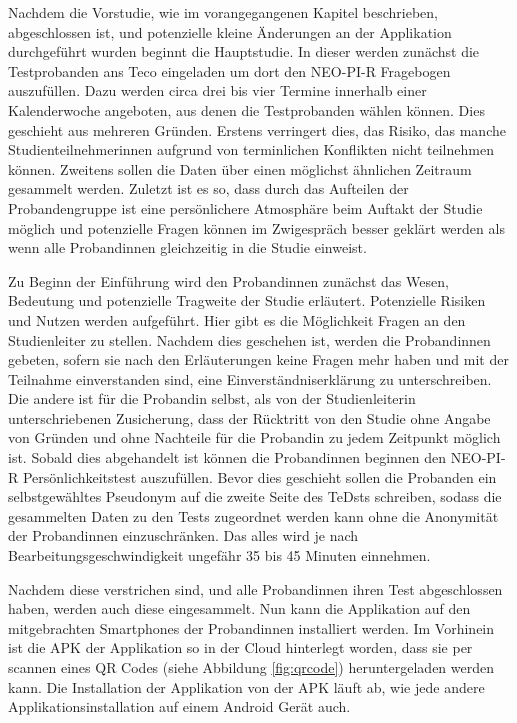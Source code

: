 Nachdem die Vorstudie, wie im vorangegangenen Kapitel beschrieben, abgeschlossen ist, und potenzielle kleine Änderungen an der Applikation durchgeführt wurden beginnt die Hauptstudie.
In dieser werden zunächst die Testprobanden ans Teco eingeladen um dort den NEO-PI-R Fragebogen auszufüllen.
Dazu werden circa drei bis vier Termine innerhalb einer Kalenderwoche angeboten, aus denen die Testprobanden wählen können.
Dies geschieht aus mehreren Gründen. 
Erstens verringert dies, das Risiko, das manche Studienteilnehmerinnen aufgrund von terminlichen Konflikten nicht teilnehmen können.
Zweitens sollen die Daten über einen möglichst ähnlichen Zeitraum gesammelt werden.
Zuletzt ist es so, dass durch das Aufteilen der Probandengruppe ist eine persönlichere Atmosphäre beim Auftakt der Studie möglich
und potenzielle Fragen können im Zwigespräch besser geklärt werden als wenn alle Probandinnen gleichzeitig in die Studie einweist.
\par
Zu Beginn der Einführung wird den Probandinnen zunächst das Wesen, Bedeutung und potenzielle Tragweite der Studie erläutert.
Potenzielle Risiken und Nutzen werden aufgeführt.
Hier gibt es die Möglichkeit Fragen an den Studienleiter zu stellen.
Nachdem dies geschehen ist, werden die Probandinnen gebeten, sofern sie nach den Erläuterungen keine Fragen mehr haben und mit der Teilnahme einverstanden sind, eine Einverständniserklärung zu unterschreiben.
Die andere ist für die Probandin selbst, als von der Studienleiterin unterschriebenen Zusicherung, dass der Rücktritt von den Studie ohne Angabe von Gründen und ohne Nachteile für die Probandin zu jedem Zeitpunkt möglich ist.
Sobald dies abgehandelt ist können die Probandinnen beginnen den NEO-PI-R Persönlichkeitstest auszufüllen.
Bevor dies geschieht sollen die Probanden ein selbstgewähltes Pseudonym auf die zweite Seite des TeDsts schreiben, sodass die gesammelten Daten zu den Tests zugeordnet werden kann ohne die Anonymität der Probandinnen einzuschränken.
Das alles wird je nach Bearbeitungsgeschwindigkeit ungefähr 35 bis 45 Minuten einnehmen.
\par
Nachdem diese verstrichen sind, und alle Probandinnen ihren Test abgeschlossen haben, werden auch diese eingesammelt.
Nun kann die Applikation auf den mitgebrachten Smartphones der Probandinnen installiert werden.
Im Vorhinein ist die APK der Applikation so in der Cloud hinterlegt worden, dass sie per scannen eines QR Codes (siehe Abbildung \ref{fig:qrcode}) heruntergeladen werden kann.
Die Installation der Applikation von der APK läuft ab, wie jede andere Applikationsinstallation auf einem Android Gerät auch.
